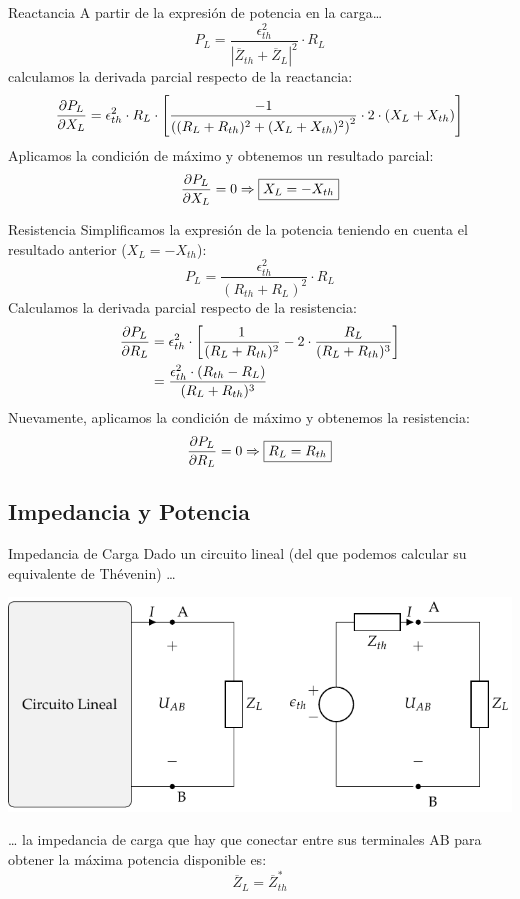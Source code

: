 \documentclass[aspectratio=169, usenames,svgnames,dvipsnames]{beamer}
\begin{document}
\begin{frame}[label={sec:org3d929e5}]{Reactancia}
A partir de la expresión de potencia en la carga\ldots{}
\[
  P_L = \frac{\epsilon^2_{th}}{|\overline{Z}_{th} + \overline{Z}_L|^2} \cdot R_L
\]
calculamos la derivada parcial respecto de la reactancia:
\[
  \diffp{P_L}{X_L} = \epsilon^2_{th} \cdot R_L \cdot \left[\frac{-1}{\left((R_L + R_{th})^2 + (X_L + X_{th})^2\right)^2} \cdot 2 \cdot (X_L + X_{th})\right]
\]
Aplicamos la condición de máximo y obtenemos un resultado parcial:
\[
   \diffp{P_L}{X_L} = 0 \Rightarrow \boxed{X_L = - X_{th}}
\]
\end{frame}

\begin{frame}[label={sec:org0111974}]{Resistencia}
Simplificamos la expresión de la potencia teniendo en cuenta el resultado anterior (\(X_L = - X_{th}\)):
\[
  P_L = \frac{\epsilon^2_{th}}{(R_{th} + R_L)^2} \cdot R_L
\]
Calculamos la derivada parcial respecto de la resistencia:
\begin{align*}
  \diffp{P_L}{R_L} &= \epsilon^2_{th} \cdot \left[\frac{1}{(R_L + R_{th})^2} - 2 \cdot \frac{R_L}{(R_L + R_{th})^3}\right]\\
		   &= \frac{\epsilon^2_{th} \cdot (R_{th} - R_L)}{(R_L + R_{th})^3}
\end{align*}
Nuevamente, aplicamos la condición de máximo y obtenemos la resistencia:
\[
   \diffp{P_L}{R_L} = 0 \Rightarrow \boxed{R_L = R_{th}}
\]
\end{frame}


\subsection{Impedancia y Potencia}
\label{sec:org7ff2600}

\begin{frame}[label={sec:org71ba8a7}]{Impedancia de Carga}
Dado un circuito lineal (del que podemos calcular su equivalente de Thévenin) \ldots{}
\begin{center}
\includegraphics[height=0.45\textheight]{../figs/EquivalenteThevenin.pdf}
\end{center}

\ldots{} la impedancia de carga que hay que conectar entre sus terminales AB para obtener la máxima potencia disponible es:
\[
  \boxed{\overline{Z}_L = \overline{Z}_{th}^*}
\]
\end{frame}
\end{document}
